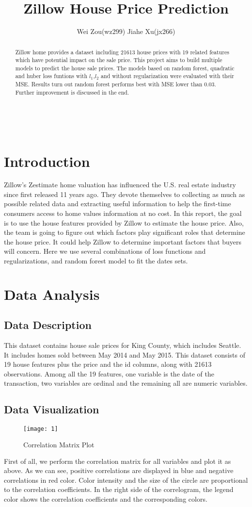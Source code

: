 \documentclass[12pt,twocolumn,twoside]{article}
\begin{document}
\lipsum[0]
\title{Zillow House Price Prediction}\\
\author{Wei Zou(wz299) Jiahe Xu(jx266)}
\maketitle
\begin{abstract}
Zillow home provides a dataset including 21613 house prices with 19 related features which have potential impact on the sale price. This project aims to build multiple models to predict the house sale prices. The models based on random forest, quadratic and huber loss funtions with $l_1$,$l_2$ and without regularization were evaluated with their MSE. Results turn out random forest performs best with MSE lower than 0.03. Further improvement is discussed in the end.
\end{abstract}
\section{Introduction}
Zillow's Zestimate home valuation has influenced the U.S. real estate industry since first released 11 years ago. 
They devote themselves to collecting as much as possible related data and extracting useful information to help the first-time consumers access to home values information at no cost. 
In this report, the goal is to use the house features provided by Zillow to estimate the house price. Also, the team is going to figure out which factors play significant roles that determine the house price. It could help Zillow to determine important factors that buyers will concern. Here we use several combinations of loss functions and regularizations, and random forest model to fit the dates sets.
\section{Data Analysis}
\subsection{Data Description}
This dataset contains house sale prices for King County, which includes Seattle. It includes homes sold between May 2014 and May 2015. This dataset consists of 19 house features plus the price and the id columns, along with 21613 observations. Among all the 19 features, one variable is the date of the transaction, two variables are ordinal and the remaining all are numeric variables.

\subsection{Data Visualization}
\begin{figure}[h]
\texttt{[image: 1]}
\caption{ Correlation Matrix Plot}
\end{figure}
First of all, we perform the correlation matrix for all variables and plot it as above. As we can see, positive correlations are displayed in blue and negative correlations in red color. Color intensity and the size of the circle are proportional to the correlation coefficients. In the right side of the correlogram, the legend color shows the correlation coefficients and the corresponding colors.
\end{document}
